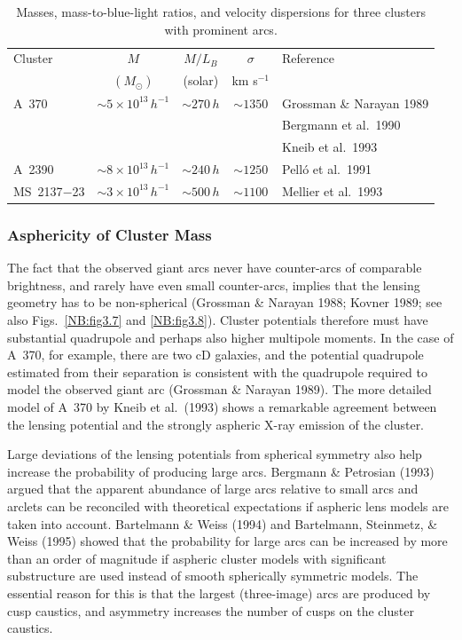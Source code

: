 \documentclass[a4paper,10pt]{article} %
\begin{document}
\begin{table}
  \caption{Masses, mass-to-blue-light ratios, and velocity dispersions
  for three clusters with prominent arcs.}
\medskip %
  \begin{center}
  \begin{tabular}{|l|cccl|}
  \hline\hline
    Cluster & $M$ & $M/L_B$ & $\sigma$ & Reference \\
    & $(M_\odot)$ & (solar) & km s$^{-1}$ & \\
  \hline\hline
    A~370 & $\sim5\times10^{13}\,h^{-1}$ & $\sim270\,h$ &
    $\sim1350$ &
    Grossman \& Narayan 1989 \\
    &&&& Bergmann et al.\ 1990 \\
    &&&& Kneib et al.\ 1993 \\
  \hline
    A~2390 & $\sim8\times10^{13}\,h^{-1}$ & $\sim240\,h$ &
    $\sim1250$ &
    Pell\'o et al.\ 1991 \\
  \hline
    MS~2137$-$23 & $\sim3\times10^{13}\,h^{-1}$ & $\sim500\,h$ &
    $\sim1100$ &
    Mellier et al.\ 1993 \\
  \hline\hline
  \end{tabular}
  \end{center}
\label{NB:tab4.1}
\end{table}

\subsubsection{Asphericity of Cluster Mass}
\label{NB:subsubsect4.1.3}

The fact that the observed giant arcs never have counter-arcs of
comparable brightness, and rarely have even small counter-arcs,
implies that the lensing geometry has to be non-spherical (Grossman \&
Narayan 1988; Kovner 1989; see also Figs.\ \ref{NB:fig3.7} and
\ref{NB:fig3.8}). Cluster potentials therefore must have substantial
quadrupole and perhaps also higher multipole moments. In the case of
A~370, for example, there are two cD galaxies, and the potential
quadrupole estimated from their separation is consistent with the
quadrupole required to model the observed giant arc (Grossman \&
Narayan 1989). The more detailed model of A~370 by Kneib et al.\
(1993) shows a remarkable agreement between the lensing potential and
the strongly aspheric X-ray emission of the cluster.

Large deviations of the lensing potentials from spherical symmetry
also help increase the probability of producing large arcs. Bergmann
\& Petrosian (1993) argued that the apparent abundance of large arcs
relative to small arcs and arclets can be reconciled with theoretical
expectations if aspheric lens models are taken into
account. Bartelmann \& Weiss (1994) and Bartelmann, Steinmetz, \&
Weiss (1995) showed that the probability for large arcs can be
increased by more than an order of magnitude if aspheric cluster
models with significant substructure are used instead of smooth
spherically symmetric models. The essential reason for this is that
the largest (three-image) arcs are produced by cusp caustics, and
asymmetry increases the number of cusps on the cluster caustics.
\end{document}
